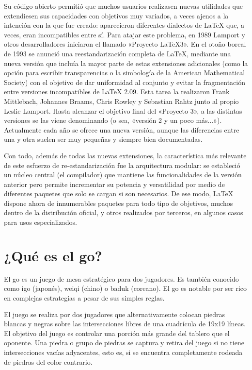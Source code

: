 \documentclass[12pt,a4paper]{report}
\begin{document}
Su código abierto permitió que muchos usuarios realizasen nuevas utilidades que extendiesen sus capacidades con objetivos muy variados, a veces ajenos a la intención con la que fue creado: aparecieron diferentes dialectos de LaTeX que, a veces, eran incompatibles entre sí. Para atajar este problema, en 1989 Lamport y otros desarrolladores iniciaron el llamado «Proyecto LaTeX3». En el otoño boreal de 1993 se anunció una reestandarización completa de LaTeX, mediante una nueva versión que incluía la mayor parte de estas extensiones adicionales (como la opción para escribir transparencias o la simbología de la American Mathematical Society) con el objetivo de dar uniformidad al conjunto y evitar la fragmentación entre versiones incompatibles de LaTeX 2.09. Esta tarea la realizaron Frank Mittlebach, Johannes Braams, Chris Rowley y Sebastian Rahtz junto al propio Leslie Lamport. Hasta alcanzar el objetivo final del «Proyecto 3», a las distintas versiones se las viene denominando  (o sea, «versión 2 y un poco más...»). Actualmente cada año se ofrece una nueva versión, aunque las diferencias entre una y otra suelen ser muy pequeñas y siempre bien documentadas.

Con todo, además de todas las nuevas extensiones, la característica más relevante de este esfuerzo de re-estandarización fue la arquitectura modular: se estableció un núcleo central (el compilador) que mantiene las funcionalidades de la versión anterior pero permite incrementar su potencia y versatilidad por medio de diferentes paquetes que solo se cargan si son necesarios. De ese modo, LaTeX dispone ahora de innumerables paquetes para todo tipo de objetivos, muchos dentro de la distribución oficial, y otros realizados por terceros, en algunos casos para usos especializados.

\section{¿Qué es el go?}

El go es un juego de mesa estratégico para dos jugadores. Es también conocido como igo (japonés), weiqi (chino) o baduk (coreano). El go es notable por ser rico en complejas estrategias a pesar de sus simples reglas.

El juego se realiza por dos jugadores que alternativamente colocan piedras blancas y negras sobre las intersecciones libres de una cuadrícula de 19x19 líneas. El objetivo del juego es controlar una porción más grande del tablero que el oponente. Una piedra o grupo de piedras se captura y retira del juego si no tiene intersecciones vacías adyacentes, esto es, si se encuentra completamente rodeada de piedras del color contrario.
\end{document}
